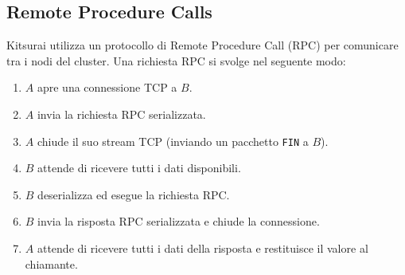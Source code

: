 \subsection{Remote Procedure Calls}
\label{subsec:rpc}

Kitsurai utilizza un protocollo di Remote Procedure Call (RPC) per comunicare tra i nodi del cluster.
Una richiesta RPC si svolge nel seguente modo:
\begin{enumerate}
    \item $A$ apre una connessione TCP a $B$.
    \item $A$ invia la richiesta RPC serializzata.
    \item $A$ chiude il suo stream TCP (inviando un pacchetto \texttt{FIN} a $B$).
    \item $B$ attende di ricevere tutti i dati disponibili.
    \item $B$ deserializza ed esegue la richiesta RPC.
    \item $B$ invia la risposta RPC serializzata e chiude la connessione.
    \item $A$ attende di ricevere tutti i dati della risposta e restituisce il valore al chiamante.
\end{enumerate}
